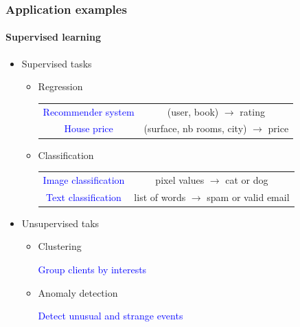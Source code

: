 \documentclass[9pt]{beamer}
\begin{document}
\begin{frame}

  \frametitle{Application examples}

  \framesubtitle{Supervised learning}

  \begin{itemize}
    \item Supervised tasks
      \begin{itemize}
      \item Regression

        \begin{center}
          \begin{tabular}{cc}
            \textcolor{blue}{Recommender system} & (user, book) $\to$ rating \\[0.2cm]
            \textcolor{blue}{House price} & (surface, nb rooms, city) $\to$ price \\[0.2cm]
        \end{tabular}
        \end{center}

      \item Classification

        \begin{center}
          \begin{tabular}{cc}
            \textcolor{blue}{Image classification} & pixel values $\to$ cat or dog \\[0.2cm]
            \textcolor{blue}{Text classification} & list of words $\to$ spam or valid email
          \end{tabular}
        \end{center}
      \end{itemize}
    \item Unsupervised taks

      \begin{itemize}
        \item Clustering
          \begin{center}
            \textcolor{blue}{Group clients by interests} \\[.5cm]
          \end{center}
        \item Anomaly detection
          \begin{center}
            \textcolor{blue}{Detect unusual and strange events}
          \end{center}
      \end{itemize}
  \end{itemize}

\end{frame}
\end{document}
